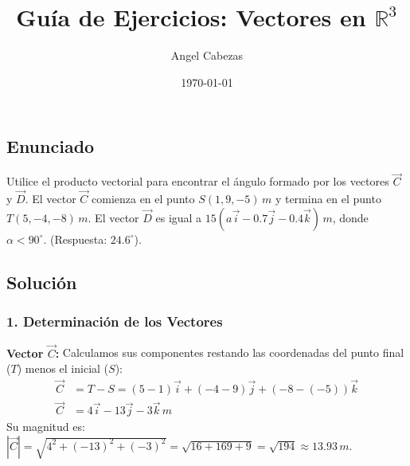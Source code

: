\documentclass[12pt, a4paper]{article}
\title{Guía de Ejercicios: Vectores en $\mathbb{R}^3$}
\author{Angel Cabezas}
\date{\today}
\begin{document}
\subsection*{Enunciado }
Utilice el producto vectorial para encontrar el ángulo formado por los vectores $\vec{C}$ y $\vec{D}$. El vector $\vec{C}$ comienza en el punto $S(1, 9, -5) \, \si{m}$ y termina en el punto $T(5, -4, -8) \, \si{m}$. El vector $\vec{D}$ es igual a $15(a\vec{i} - 0.7\vec{j} - 0.4\vec{k}) \, \si{m}$, donde $\alpha < 90^\circ$. (Respuesta: $24.6^\circ$).

\begin{center}
\end{center}

\subsection*{Solución}

\subsubsection*{1. Determinación de los Vectores}

\textbf{Vector $\vec{C}$:}
Calculamos sus componentes restando las coordenadas del punto final ($T$) menos el inicial ($S$):
\begin{align*}
    \vec{C} &= T - S = (5 - 1)\vec{i} + (-4 - 9)\vec{j} + (-8 - (-5))\vec{k} \\
    \vec{C} &= 4\vec{i} - 13\vec{j} - 3\vec{k} \, \si{m}
\end{align*}
Su magnitud es: $|\vec{C}| = \sqrt{4^2 + (-13)^2 + (-3)^2} = \sqrt{16 + 169 + 9} = \sqrt{194} \approx 13.93 \, \si{m}$.
\end{document}
